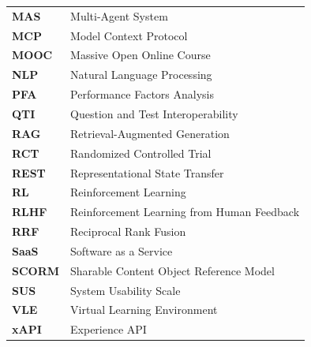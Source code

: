 \begin{longtable}{@{}L{2.6cm}L{12cm}@{}}
\textbf{MAS}    & Multi-Agent System \\
\textbf{MCP}    & Model Context Protocol \\
\textbf{MOOC}   & Massive Open Online Course \\
\textbf{NLP}    & Natural Language Processing \\
\textbf{PFA}    & Performance Factors Analysis \\
\textbf{QTI}    & Question and Test Interoperability \\
\textbf{RAG}    & Retrieval-Augmented Generation \\
\textbf{RCT}    & Randomized Controlled Trial \\
\textbf{REST}   & Representational State Transfer \\
\textbf{RL}     & Reinforcement Learning \\
\textbf{RLHF}   & Reinforcement Learning from Human Feedback \\
\textbf{RRF}    & Reciprocal Rank Fusion \\
\textbf{SaaS}   & Software as a Service \\
\textbf{SCORM}  & Sharable Content Object Reference Model \\
\textbf{SUS}    & System Usability Scale \\
\textbf{VLE}    & Virtual Learning Environment \\
\textbf{xAPI}   & Experience API \\
\end{longtable}
